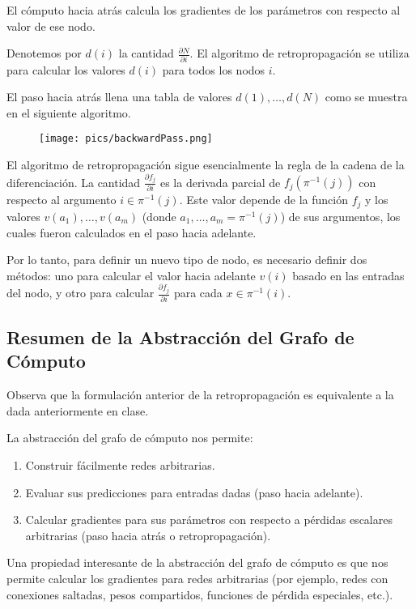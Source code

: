 El cómputo hacia atrás calcula los gradientes de los parámetros con respecto al valor de ese nodo.

Denotemos por $d(i)$ la cantidad $\frac{\partial N}{\partial i}$. El algoritmo de retropropagación se utiliza para calcular los valores $d(i)$ para todos los nodos $i$.

El paso hacia atrás llena una tabla de valores $d(1), \dots, d(N)$ como se muestra en el siguiente algoritmo.

\begin{figure}[htb]
	\centering
	 \texttt{[image: pics/backwardPass.png]}
\end{figure}

El algoritmo de retropropagación sigue esencialmente la regla de la cadena de la diferenciación. La cantidad $\frac{\partial f_j}{\partial i}$ es la derivada parcial de $f_j(\pi^{-1}(j))$ con respecto al argumento $i \in \pi^{-1}(j)$. Este valor depende de la función $f_j$ y los valores $v(a_1), \dots, v(a_m)$ (donde $a_1, \dots, a_m = \pi^{-1}(j)$) de sus argumentos, los cuales fueron calculados en el paso hacia adelante.

Por lo tanto, para definir un nuevo tipo de nodo, es necesario definir dos métodos: uno para calcular el valor hacia adelante $v(i)$ basado en las entradas del nodo, y otro para calcular $\frac{\partial f_j}{\partial i}$ para cada $x \in \pi^{-1}(i)$.

\subsection{Resumen de la Abstracción del Grafo de Cómputo}
Observa que la formulación anterior de la retropropagación es equivalente a la dada anteriormente en clase.

La abstracción del grafo de cómputo nos permite:

\begin{enumerate}
  \item Construir fácilmente redes arbitrarias.
  \item Evaluar sus predicciones para entradas dadas (paso hacia adelante).
  \item Calcular gradientes para sus parámetros con respecto a pérdidas escalares arbitrarias (paso hacia atrás o retropropagación).
\end{enumerate}

Una propiedad interesante de la abstracción del grafo de cómputo es que nos permite calcular los gradientes para redes arbitrarias (por ejemplo, redes con conexiones saltadas, pesos compartidos, funciones de pérdida especiales, etc.).

